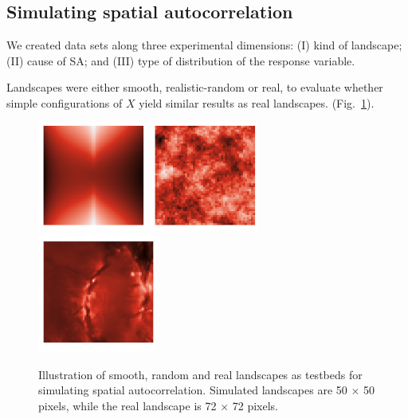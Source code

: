 \documentclass[11pt]{article}
\begin{document}
\subsection{Simulating spatial autocorrelation}
We created data sets along three experimental dimensions: (I) kind of landscape; (II) cause of SA; and (III) type of distribution of the response variable.

Landscapes were either smooth, realistic-random or real, to evaluate whether simple configurations of $X$ yield similar results as real landscapes. (Fig.~\ref{fig:landscapes}).

\begin{figure}
\includegraphics[width=0.32\textwidth]{simulation/documentation/figures/p_smooth6}
\includegraphics[width=0.32\textwidth]{simulation/documentation/figures/p_realistic4}
\includegraphics[width=0.35\textwidth]{simulation/documentation/figures/p_real1}
\caption{Illustration of smooth, random and real landscapes as testbeds for simulating spatial autocorrelation. Simulated landscapes are 50 $\times$ 50 pixels, while the real landscape is 72 $\times$ 72 pixels.}
\label{fig:landscapes}
\end{figure}
\end{document}
